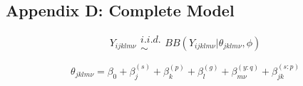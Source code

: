 \documentclass[12pt]{article}
\begin{document}
%
%
%
%
%
%
%
%

%
\subsection{Appendix D: Complete Model}\label{modelAppendix}

%
\begin{equation}
Y_{ijklm\nu} \substack{i.i.d.\\\sim} BB(Y_{ijklm\nu}|\theta_{jklm\nu}, \phi)
\end{equation}

%
\begin{equation}
\theta_{jklm\nu} = \beta_0 + \beta^{(s)}_j + \beta^{(p)}_k + \beta^{(g)}_l + \beta^{(y:q)}_{m\nu} + \beta^{(s:p)}_{jk}
\end{equation}
\end{document}
